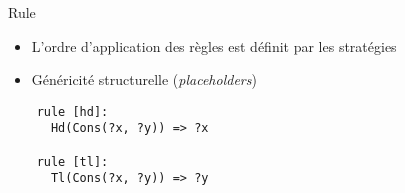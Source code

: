 \begin{frame}[fragile]{Rule}
  \begin{itemize}
  \item L'ordre d'application des règles est définit par les stratégies
  \item Généricité structurelle (\emph{placeholders})
  \end{itemize}

  \begin{verbatim}
    rule [hd]:
      Hd(Cons(?x, ?y)) => ?x

    rule [tl]:
      Tl(Cons(?x, ?y)) => ?y
  \end{verbatim}
\end{frame}
